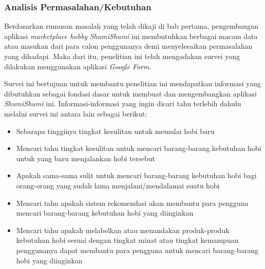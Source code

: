 \documentclass[a4paper]{article}
\newcommand{\subsubbab}[1]{%
    \subsubsection{#1}%
}
\begin{document}

\subsubbab{Analisis Permasalahan/Kebutuhan}
Berdasarkan rumusan masalah yang telah dikaji di bab pertama, pengembangan aplikasi \textit{marketplace hobby} \textit{ShumiShumi} ini membutuhkan berbagai macam data atau masukan dari para calon penggunanya demi menyelesaikan permasalahan yang dihadapi. Maka dari itu, penelitian ini telah mengadakan survei yang dilakukan menggunakan aplikasi \textit{Google Form}.

Survei ini bertujuan untuk membantu penelitian ini mendapatkan informasi yang dibutuhkan sebagai fondasi dasar untuk membuat dan mengembangkan aplikasi \textit{ShumiShumi} ini. Informasi-informasi yang ingin dicari tahu terlebih dahulu melalui survei ini antara lain sebagai berikut:

\begin{itemize}
    \item Sebarapa tingginya tingkat kesulitan untuk memulai hobi baru
    \item Mencari tahu tingkat kesulitan untuk mencari barang-barang kebutuhan hobi untuk yang baru menjalankan hobi tersebut
    \item Apakah sama-sama sulit untuk mencari barang-barang kebutuhan hobi bagi orang-orang yang sudah lama menjalani/mendalamai suatu hobi
    \item Mencari tahu apakah sistem rekomendasi akan membantu para pengguna mencari barang-barang kebutuhan hobi yang diinginkan
    \item Mencari tahu apakah melabelkan atau menandakan produk-produk kebutuhan hobi sesuai dengan tingkat minat atau tingkat kemampuan penggunanya dapat membantu para pengguna untuk mencari barang-barang hobi yang diinginkan
\end{itemize}
\end{document}
